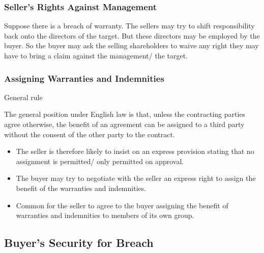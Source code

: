 \documentclass[
]{article}
\providecommand{\tightlist}{%
  \setlength{\itemsep}{0pt}\setlength{\parskip}{0pt}}
\newenvironment{env-9193a5b6-f9d9-4a5c-9922-4e221c0d52be}
{
    \savenotes\tcolorbox[blanker,breakable,left=5pt,borderline west={2pt}{-4pt}{darkred}]
}
{
    \endtcolorbox\spewnotes
}
\begin{document}
\hypertarget{sellers-rights-against-management}{%
\subsubsection{Seller's Rights Against
Management}\label{sellers-rights-against-management}}

Suppose there is a breach of warranty. The sellers may try to shift
responsibility back onto the directors of the target. But these
directors may be employed by the buyer. So the buyer may ask the selling
shareholders to waive any right they may have to bring a claim against
the management/ the target.

\hypertarget{assigning-warranties-and-indemnities}{%
\subsubsection{Assigning Warranties and
Indemnities}\label{assigning-warranties-and-indemnities}}

\begin{env-9193a5b6-f9d9-4a5c-9922-4e221c0d52be}

General rule

The general position under English law is that, unless the contracting
parties agree otherwise, the benefit of an agreement can be assigned to
a third party without the consent of the other party to the contract.

\end{env-9193a5b6-f9d9-4a5c-9922-4e221c0d52be}

\begin{itemize}
\tightlist
\item
  The seller is therefore likely to insist on an express provision
  stating that no assignment is permitted/ only permitted on approval.
\item
  The buyer may try to negotiate with the seller an express right to
  assign the benefit of the warranties and indemnities.
\item
  Common for the seller to agree to the buyer assigning the benefit of
  warranties and indemnities to members of its own group.
\end{itemize}

\hypertarget{buyers-security-for-breach}{%
\subsection{Buyer's Security for
Breach}\label{buyers-security-for-breach}}
\end{document}
